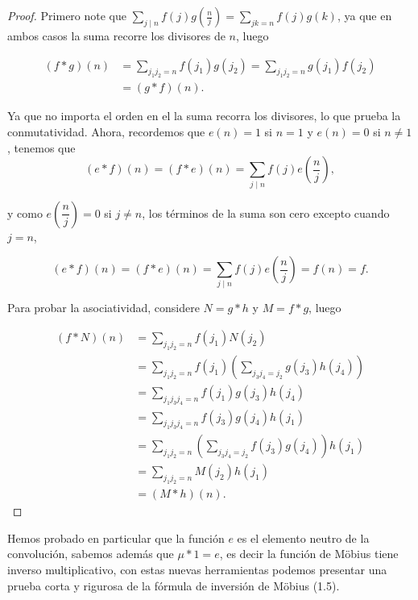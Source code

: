 \begin{proof}

Primero note que $\displaystyle\sum_{j\mid n} f(j)g \left( \frac{n}{j} \right)=\sum_{jk=n} f(j)g(k)$, ya que en ambos casos la suma recorre los divisores de $n$, luego

$$\begin{aligned}
(f * g)(n) & =\sum_{j_1 j_2=n} f\left(j_1\right) g\left(j_2\right )=\sum_{j_1 j_2=n} g\left(j_1\right) f\left(j_2\right) \\
& =(g * f)(n).
\end{aligned}$$

Ya que no importa el orden en el la suma recorra los divisores, lo que prueba la conmutatividad. Ahora, recordemos que $e(n)=1$ si $n=1$ y $e(n)=0$ si $n\neq 1$, tenemos que
$$(e*f)(n)=(f*e)(n)=\sum_{j\mid n}f(j)e \left( \frac{n}{j} \right),$$

y como $e \left( \dfrac{n}{j} \right)=0$ si $j\neq n$, los términos de la suma son cero excepto cuando $j=n$, 

$$(e*f)(n)=(f*e)(n)=\sum_{j\mid n}f(j)e \left( \frac{n}{j} \right)=f(n)=f.$$

Para probar la asociatividad, considere $N=g*h$ y $M=f*g$, luego

$$
\begin{aligned}
(f * N)(n) & =\sum_{j_1 j_2=n} f\left(j_1\right) N\left(j_2\right) \\
& =\sum_{j_1 j_2=n} f\left(j_1\right)\left(\sum_{j_3 j_4=j_2} g\left(j_3\right) h\left(j_4\right)\right) \\
& =\sum_{j_1 j_3 j_4=n} f\left(j_1\right) g\left(j_3\right) h\left(j_4\right)\\
& =\sum_{j_1 j_3 j_4=n} f\left(j_3\right) g\left(j_4\right) h\left(j_1\right)\\
& =\sum_{j_1 j_2=n}\left(\sum_{j_3 j_4=j_2} f\left(j_3\right) g\left(j_4\right)\right) h\left(j_1\right)\\
& =\sum_{j_1 j_2=n} M\left(j_2\right) h\left(j_1\right)\\
&=(M * h)(n).
\end{aligned}
$$

\end{proof}

Hemos  probado en particular que la función $e$ es el elemento neutro de la convolución, sabemos además que $\mu *1=e$, es decir la función de Möbius tiene inverso multiplicativo, con estas nuevas herramientas podemos presentar una prueba corta y rigurosa de la fórmula de inversión de Möbius (1.5).

